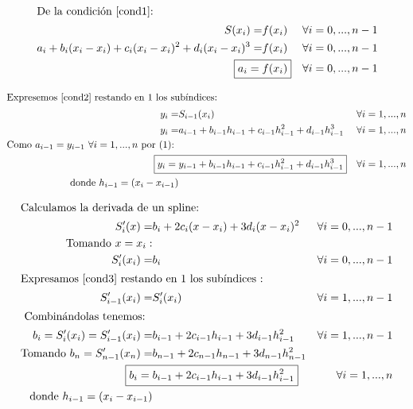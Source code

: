 \begin{align*}
\intertext{De la condición \eqref{cond1}: } 
S(x_i) = & f(x_i)				& \forall i=0, ..., n-1 \\
a_i + b_i(x_i-x_i) + c_i(x_i-x_i)^2 + d_i(x_i-x_i)^3  = & f(x_i) 	& \forall i=0, ..., n-1 \\
\Aboxed{a_i = & f(x_i)} 	& \forall i=0, ..., n-1 \\
\end{align*}


\begin{align*}
\intertext{Expresemos \eqref{cond2} restando en 1 los subíndices: }
y_i = & S_{i-1}(x_i)				& \forall i=1, ..., n \\
y_i = & a_{i-1} + b_{i-1}h_{i-1} + c_{i-1}h_{i-1}^2 +  d_{i-1}h_{i-1}^3 & \forall i=1, ..., n \\
\text{Como } a_{i-1} = y_{i-1} \ \forall i=1, ..., n \text{ por (1): } \\
\Aboxed{y_i = & y_{i-1} + b_{i-1}h_{i-1} + c_{i-1}h_{i-1}^2 +  d_{i-1}h_{i-1}^3} & \forall i=1, ..., n \\
\text{donde } h_{i-1} = (x_i-x_{i-1}) \\
\end{align*}

\begin{align*}
\intertext{Calculamos la derivada de un spline: }
S'_i(x) = & b_i + 2c_i(x-x_i) + 3d_i(x-x_i)^2  & \forall i=0, ..., n-1 \\
\text{Tomando } x = x_i:  \\
S'_i(x_i) = & b_i	 & \forall i=0, ..., n-1 \\
\intertext{Expresamos \eqref{cond3} restando en 1 los subíndices : }
S'_{i-1}(x_i) = & S'_i(x_i) 	 & \forall i= 1, ..., n-1 \\
\intertext{ Combinándolas tenemos: } 
b_i =  S'_i(x_i) = S'_{i-1}(x_i) = & b_{i-1} + 2c_{i-1}h_{i-1} + 3d_{i-1}h_{i-1}^2 & \forall i=1, ..., n-1 \\
\text{Tomando } b_n =  S'_{n-1}(x_n) = & b_{n-1} + 2c_{n-1}h_{n-1} + 3d_{n-1}h_{n-1}^2 & \\
\Aboxed{b_i = & b_{i-1} + 2c_{i-1}h_{i-1} + 3d_{i-1}h_{i-1}^2} & \forall i=1, ..., n \\
\text{donde } h_{i-1} = (x_i-x_{i-1}) \\
\end{align*}

